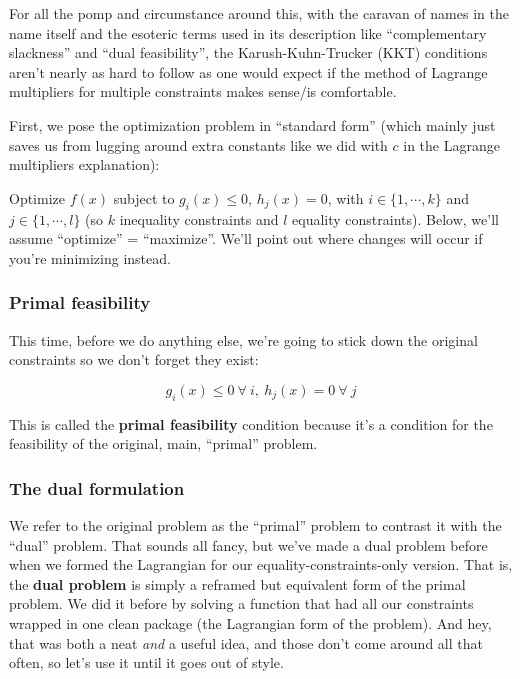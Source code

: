 \documentclass[letterpaper,12pt]{report}
\begin{document}
For all the pomp and circumstance around this, with the caravan of names
in the name itself and the esoteric terms used in its description like
``complementary slackness'' and ``dual feasibility'', the
Karush-Kuhn-Trucker (KKT) conditions aren't nearly as hard to follow as
one would expect if the method of Lagrange multipliers for multiple
constraints makes sense/is comfortable.

First, we pose the optimization problem in ``standard form'' (which mainly
just saves us from lugging around extra constants like we did with \(c\)
in the Lagrange multipliers explanation):

Optimize \(f(x)\) subject to \(g_i(x)\leq 0\), \(h_j(x)=0\), with
\(i \in \{1, \cdots, k\}\) and \(j \in \{1, \cdots, l\}\) (so \(k\)
inequality constraints and \(l\) equality constraints). Below, we'll
assume ``optimize'' = ``maximize''. We'll point out where changes will occur
if you're minimizing instead.

\subsubsection{Primal feasibility}\label{primal-feasibility}

This time, before we do anything else, we're going to stick down the
original constraints so we don't forget they exist:

\[ g_i(x)\leq 0 \ \forall \ i, \ h_j(x) = 0 \ \forall \ j \]

This is called the \textbf{primal feasibility} condition because it's a
condition for the feasibility of the original, main, ``primal'' problem.

\subsubsection{The dual formulation}\label{the-dual-formulation}

We refer to the original problem as the ``primal'' problem to contrast it
with the ``dual'' problem. That sounds all fancy, but we've made a dual
problem before when we formed the Lagrangian for our
equality-constraints-only version. That is, the 
\textbf{dual problem}  is simply a
reframed but equivalent form of the primal problem. We did it before by
solving a function that had all our constraints wrapped in one clean
package (the Lagrangian form of the problem). And hey, that was both a
neat \emph{and} a useful idea, and those don't come around all that
often, so let's use it until it goes out of style.
\end{document}
